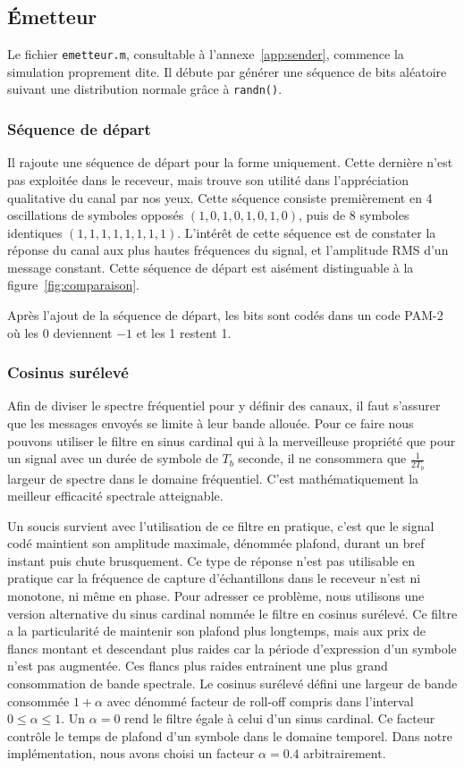\documentclass[10pt, oneside, a4paper]{article}
\begin{document}
\subsection{Émetteur}
Le fichier \texttt{emetteur.m}, consultable à l'annexe~\ref{app:sender}, commence la simulation proprement dite.
Il débute par générer une séquence de bits aléatoire suivant une distribution normale grâce à \texttt{randn()}.

\subsubsection{Séquence de départ}
Il rajoute une séquence de départ pour la forme uniquement.
Cette dernière n'est pas exploitée dans le receveur, mais trouve son utilité dans l'appréciation qualitative du canal par nos yeux.
Cette séquence consiste premièrement en 4 oscillations de symboles opposés $(1,0,1,0,1,0,1,0)$, puis de 8 symboles identiques $(1,1,1,1,1,1,1,1)$.
L'intérêt de cette séquence est de constater la réponse du canal aux plus hautes fréquences du signal, et l'amplitude RMS d'un message constant.
Cette séquence de départ est aisément distinguable à la figure~\ref{fig:comparaison}.

Après l'ajout de la séquence de départ, les bits sont codés dans un code PAM-2 où les 0 deviennent $-1$ et les 1 restent 1.

\subsubsection{Cosinus surélevé}
Afin de diviser le spectre fréquentiel pour y définir des canaux, il faut s'assurer que les messages envoyés se limite à leur bande allouée.
Pour ce faire nous pouvons utiliser le filtre en sinus cardinal qui à la merveilleuse propriété que pour un signal avec un durée de symbole de $T_b$ seconde, il ne consommera que $\frac{1}{2T_b}$ largeur de spectre dans le domaine fréquentiel.
C'est mathématiquement la meilleur efficacité spectrale atteignable.

Un soucis survient avec l'utilisation de ce filtre en pratique, c'est que le signal codé maintient son amplitude maximale, dénommée plafond, durant un bref instant puis chute brusquement.
Ce type de réponse n'est pas utilisable en pratique car la fréquence de capture d'échantillons dans le receveur n'est ni monotone, ni même en phase.
Pour adresser ce problème, nous utilisons une version alternative du sinus cardinal nommée le filtre en cosinus surélevé.
Ce filtre a la particularité de maintenir son plafond plus longtemps, mais aux prix de flancs montant et descendant plus raides car la période d'expression d'un symbole n'est pas augmentée.
Ces flancs plus raides entrainent une plus grand consommation de bande spectrale.
Le cosinus surélevé défini une largeur de bande consommée $1+\alpha$ avec \alpha{} dénommé \og{}facteur de roll-off\fg{} compris dans l'interval $0\leq\alpha\leq1$.
Un $\alpha = 0$ rend le filtre égale à celui d'un sinus cardinal.
Ce facteur contrôle le temps de plafond d'un symbole dans le domaine temporel.
Dans notre implémentation, nous avons choisi un facteur $\alpha = \num{0.4}$ arbitrairement.
\end{document}
